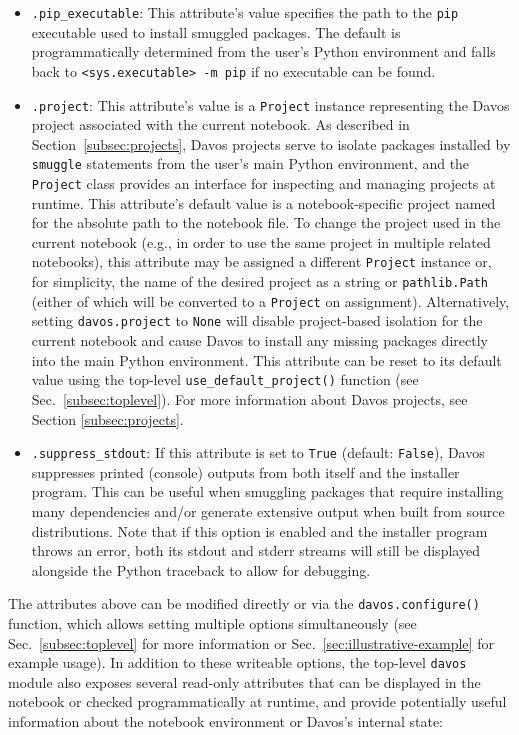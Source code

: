 \documentclass[preprint,12pt,a4paper]{elsarticle}
\begin{document}
\begin{itemize}
\item \texttt{.pip\_executable}: This attribute's value specifies the
  path to the \texttt{pip} executable used to install smuggled
  packages. The default is programmatically determined from the user's Python
  environment and falls back to \texttt{<sys.executable> -m pip} if no
  executable can be found.

\item \texttt{.project}: This attribute's value is a \texttt{Project} instance representing the Davos project associated with the current notebook. As described in Section~\ref{subsec:projects}, Davos projects serve to isolate packages installed by \texttt{smuggle} statements from the user's main Python environment, and the \texttt{Project} class provides an interface for inspecting and managing projects at runtime. This attribute's default value is a notebook-specific project named for the absolute path to the notebook file. To change the project used in the current notebook (e.g., in order to use the same project in multiple related notebooks), this attribute may be assigned a different \texttt{Project} instance or, for simplicity, the name of the desired project as a string or \texttt{pathlib.Path} (either of which will be converted to a \texttt{Project} on assignment). Alternatively, setting \texttt{davos.project} to \texttt{None} will disable project-based isolation for the current notebook and cause Davos to install any missing packages directly into the main Python environment. This attribute can be reset to its default value using the top-level \texttt{use\_default\_project()} function (see Sec.~\ref{subsec:toplevel}). For more information about Davos projects, see Section \ref{subsec:projects}.

\item \texttt{.suppress\_stdout}: If this attribute is set to
  \texttt{True} (default: \texttt{False}), Davos suppresses
  printed (console) outputs from both itself and the installer program.
  This can be useful when smuggling packages that require installing many
  dependencies and/or generate extensive output when built from source distributions. Note that if this option is enabled and the installer
  program throws an error, both its stdout and stderr streams will still be
  displayed alongside the Python traceback to allow for debugging.

\end{itemize}

\noindent The attributes above can be modified directly or via the \texttt{davos.configure()} function, which allows setting multiple options simultaneously (see Sec.~\ref{subsec:toplevel} for more information or Sec.~\ref{sec:illustrative-example} for example usage). In addition to these writeable options, the top-level \texttt{davos} module also exposes several read-only attributes that can be displayed in the notebook or checked programmatically at runtime, and provide potentially useful information about the notebook environment or Davos's internal state:
\end{document}
